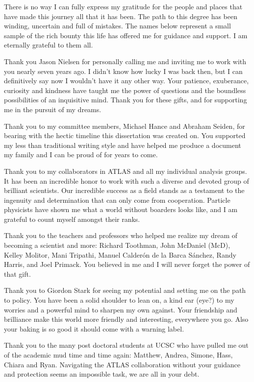 \label{sec:acknowledgements}

There is no way I can fully express my gratitude for the people and places that
have made this journey all that it has been.  The path to this degree has been
winding, uncertain and full of mistakes.  The names below represent a small
sample of the rich bounty this life has offered me for guidance and support. I
am eternally grateful to them all.

Thank you Jason Nielsen for personally calling me and inviting me to work with
you nearly seven years ago.  I didn't know how lucky I was back then, but I can
definitively say now I wouldn't have it any other way.  Your patience,
exuberance, curiosity and kindness have taught me the power of questions and
the boundless possibilities of an inquisitive mind. Thank you for these gifts,
and for supporting me in the pursuit of my dreams.

Thank you to my committee members, Michael Hance and Abraham Seiden, for
bearing with the hectic timeline this dissertation was created on.  You
supported my less than traditional writing style and have helped me produce a
document  my family and I can be proud of for years to come.

Thank you to my collaborators in ATLAS and all my individual analysis groups.
It has been an incredible honor to work with such a diverse and devoted group
of brilliant scientists.  Our incredible success as a field stands as a
testament to the ingenuity and determination that can only come from
cooperation.  Particle physicists have shown me what a world without boarders
looks like, and I am grateful to count myself amongst their ranks.

Thank you to the teachers and professors who helped me realize my dream of
becoming a scientist and more: Richard Toothman, John McDaniel (McD), Kelley
Molitor, Mani Tripathi, Manuel Calder\'on de la Barca S\'anchez, Randy Harris,
and Joel Primack.  You believed in me and I will never forget the power of that
gift.

Thank you to Giordon Stark for seeing my potential and setting me on the path
to policy.  You have been a solid shoulder to lean on, a kind ear (eye?) to my
worries and a powerful mind to sharpen my own against. Your friendship and
brilliance make this world more friendly and interesting, everywhere you go.
Also your baking is so good it should come with a warning label.

Thank you to the many post doctoral students at UCSC who have pulled me out of
the academic mud time and time again: Matthew, Andrea, Simone, Hass, Chiara and
Ryan.  Navigating the ATLAS collaboration without your guidance and protection
seems an impossible task, we are all in your debt.

